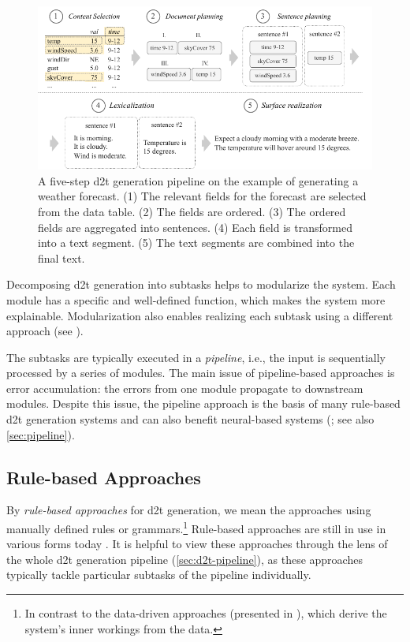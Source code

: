 {\begin{figure}[t]
    \centering
    \includegraphics[width=\textwidth]{img/pipeline.pdf}

    \caption{A five-step \ac{d2t} generation pipeline on the example of generating a weather forecast. (1) The relevant fields for the forecast are selected from the data table. (2) The fields are ordered. (3) The ordered fields are aggregated into sentences. (4) Each field is transformed into a text segment. (5) The text segments are combined into the final text.}\label{fig:pipeline}

\end{figure}


Decomposing \ac{d2t} generation into subtasks helps to modularize the system. Each module has a specific and well-defined function, which makes the system more explainable. Modularization also enables realizing each subtask using a different approach (see ).

The subtasks are typically executed in a \emph{pipeline}, i.e., the input is sequentially processed by a series of modules. The main issue of pipeline-based approaches is error accumulation: the errors from one module propagate to downstream modules. Despite this issue, the pipeline approach is the basis of many rule-based \ac{d2t} generation systems \cite{milleModD2TMultilayerDataset2023} and can also benefit neural-based systems (\citealp{moryossef2019step,puduppullyDatatotextGenerationMacro2021}; see also \autoref{sec:pipeline}).


\subsection{Rule-based Approaches}
\label{sec:rule-d2t}

By \emph{rule-based approaches} for \ac{d2t} generation, we mean the approaches using manually defined rules or grammars.\footnote{In contrast to the data-driven approaches (presented in ), which derive the system's inner workings from the data.} Rule-based approaches are still in use in various forms today \cite{gattSurveyStateArt2018,daleNaturalLanguageGeneration2020,daleNavigatingTextGeneration2023}. It is helpful to view these approaches through the lens of the whole \ac{d2t} generation pipeline (\autoref{sec:d2t-pipeline}), as these approaches typically tackle particular subtasks of the pipeline individually.


}
